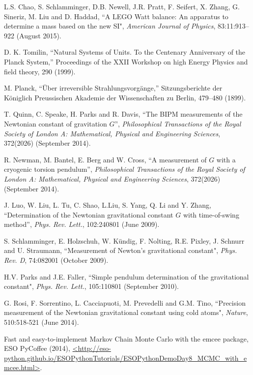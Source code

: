 \documentclass[prb,preprint]{revtex4-1}
\begin{document}
\begin{thebibliography}{99}

 L.S. Chao, S. Schlamminger, D.B. Newell, J.R. Pratt, F. Seifert, X. Zhang, G. Sineriz, M. Liu and D. Haddad, ``A LEGO Watt balance: An apparatus to determine a mass based on the new SI", \textit{American Journal of Physics}, 83:11:913--922 (August 2015).

 D. K. Tomilin, ``Natural Systems of Units. To the Centenary Anniversary of the Planck System,'' 
Proceedings of the XXII Workshop on high Energy Physics and field theory, 290 (1999).  

 M. Planck, ``\"{U}ber irreversible {S}trahlungsvorg\"{a}nge,'' 
Sitzungsberichte der K\"{o}niglich Preussischen Akademie der Wissenschaften zu Berlin, 479--480 (1899).  

 T. Quinn, C. Speake, H. Parks and R. Davis, ``The BIPM measurements of the Newtonian constant of gravitation $G$'', \textit{Philosophical Transactions of the Royal Society of London A: Mathematical, Physical and Engineering Sciences}, 372(2026) (September 2014).

 R. Newman, M. Bantel, E. Berg and W. Cross, ``A measurement of $G$ with a cryogenic torsion pendulum'', \textit{Philosophical Transactions of the Royal Society of London A: Mathematical, Physical and Engineering Sciences}, 372(2026) (September 2014).

 J. Luo, W. Liu, L. Tu, C. Shao, L.Liu, S. Yang, Q. Li and Y. Zhang, ``Determination of the Newtonian gravitational constant $G$ with time-of-swing method'', \textit{Phys. Rev. Lett.}, 102:240801 (June 2009).

 S. Schlamminger, E. Holzschuh, W. Kündig, F. Nolting, R.E. Pixley, J. Schnurr and U. Straumann, ``Measurement of Newton's gravitational constant", \textit{Phys. Rev. D}, 74:082001 (October 2009).

 H.V. Parks and J.E. Faller, ``Simple pendulum determination of the gravitational constant", \textit{Phys. Rev. Lett.}, 105:110801 (September 2010).

 G. Rosi, F. Sorrentino, L. Cacciapuoti, M. Prevedelli and G.M. Tino, ``Precision measurement of the Newtonian gravitational constant using cold atoms", \textit{Nature}, 510:518-521 (June 2014).

 Fast and easy-to-implement Markov Chain Monte Carlo with the emcee package, ESO PyCoffee (2014),
\url{<http://eso-python.github.io/ESOPythonTutorials/ESOPythonDemoDay8_MCMC_with_emcee.html>}.


\end{thebibliography}
\end{document}
